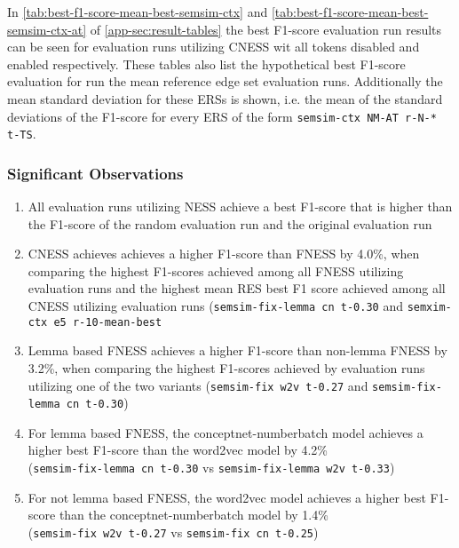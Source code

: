 \documentclass[11pt]{scrreprt}
\newcounter{listcounter}
\begin{document}
In \cref{tab:best-f1-score-mean-best-semsim-ctx} and \cref{tab:best-f1-score-mean-best-semsim-ctx-at} of \cref{app-sec:result-tables} the best F1-score evaluation run results can be seen for evaluation runs utilizing CNESS wit all tokens disabled and enabled respectively. These tables also list the hypothetical best F1-score evaluation for run the mean reference edge set evaluation runs. Additionally the mean standard deviation for these ERSs is shown, i.e. the mean of the standard deviations of the F1-score for every ERS of the form \texttt{semsim-ctx NM-AT r-N-* t-TS}.


\subsubsection{Significant Observations}
\begin{enumerate}[label=\arabic{listcounter}.\arabic*]
	\item All evaluation runs utilizing NESS achieve a best F1-score that is higher than the F1-score of the random evaluation run and the original evaluation run \label{obs-itm:NESS-higher-best-f1}
	\item CNESS achieves achieves a higher F1-score than FNESS by 4.0\%, when comparing the highest F1-scores achieved among all FNESS utilizing evaluation runs and the highest mean RES best F1 score achieved among all CNESS utilizing evaluation runs (\texttt{semsim-fix-lemma cn t-0.30} and \texttt{semxim-ctx e5 r-10-mean-best} \label{obs-itm:CNESS-higher-best-f1-than-FNESS}
	\item Lemma based FNESS achieves a higher F1-score than non-lemma FNESS by 3.2\%, when comparing the highest F1-scores achieved by evaluation runs utilizing one of the two variants (\texttt{semsim-fix w2v t-0.27} and \texttt{semsim-fix-lemma cn t-0.30}) \label{obs-itm:lemma-based-FNESS-higher-best-f1}
	\item For lemma based FNESS, the conceptnet-numberbatch model achieves a higher best F1-score than the word2vec model by 4.2\% \\ (\texttt{semsim-fix-lemma cn t-0.30} vs \texttt{semsim-fix-lemma w2v t-0.33}) \label{obs-itm:lemma-FNESS-cn-better-than-w2v}
	\item For not lemma based FNESS, the word2vec model achieves a higher best F1-score than the conceptnet-numberbatch model by 1.4\% \\ (\texttt{semsim-fix w2v t-0.27} vs \texttt{semsim-fix cn t-0.25}) \label{obs-itm:word-FNESS-w2v-better-than-cn}

\end{enumerate}
\end{document}

